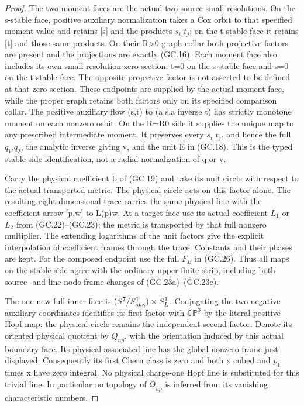\begin{proof}
The two moment faces are the actual two source small resolutions.
On the s-stable face, positive auxiliary normalization takes a
Cox orbit to that specified moment value and retains {[}s{]} and the
products \(s_{i}\) \(t_{j}\); on the t-stable face it retains {[}t{]} and those
same products. On their R\textgreater0 graph collar both projective factors
are present and the projections are exactly (GC.16). Each moment
face also includes its own small-resolution zero section: t=0
on the s-stable face and s=0 on the t-stable face. The opposite
projective factor is not asserted to be defined at that zero
section. These endpoints are supplied by the actual moment
face, while the proper graph retains both factors only on its
specified comparison collar. The positive auxiliary flow
(s,t) to (a s,a inverse t) has strictly monotone moment on each
nonzero orbit. On the R=R0 side it supplies the unique map to
any prescribed intermediate moment. It preserves every \(s_{i}\) \(t_{j}\),
and hence the full \(q_1\),\(q_2\), the analytic inverse giving v, and the
unit E in (GC.18). This is the typed stable-side identification,
not a radial normalization of q or v.

Carry the physical coefficient L of (GC.19) and take its unit
circle with respect to the actual transported metric. The physical
circle acts on this factor alone. The resulting eight-dimensional
trace carries the same physical line with the coefficient arrow
{[}p,w{]} to L(p)w. At a target face use its actual coefficient
\(L_1\) or \(L_2\) from (GC.22)--(GC.23); the metric is transported by
that full nonzero multiplier. The extending logarithms of the
unit factors give the explicit interpolation of coefficient
frames through the trace. Constants and their phases are kept.
For the composed endpoint use the full \(F_{B}\) in (GC.26).
Thus all maps on the stable side agree with the ordinary upper
finite strip, including both source- and line-node frame changes
of (GC.23a)--(GC.23c).

The one new full inner face is \((S^7/S^1_{\rm aux})\times S^1_L\). Conjugating
the two negative auxiliary coordinates identifies its first
factor with \(\mathbb{CP}^3\) by the literal positive Hopf map; the physical
circle remains the independent second factor. Denote its oriented
physical quotient by \(Q_{up}\), with the orientation induced by this
actual boundary face. Its physical associated line has the global
nonzero frame just displayed. Consequently its first Chern class
is zero and both x cubed and \(p_1\) times x have zero integral.
No physical charge-one Hopf line is substituted for this trivial
line. In particular no topology of \(Q_{up}\) is inferred from its
vanishing characteristic numbers.


\end{proof}
